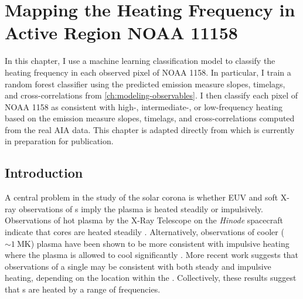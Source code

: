\chapter{Mapping the Heating Frequency in Active Region NOAA 11158}\label{ch:classifying-observables}
\thispagestyle{firstpageofchapterstyle}

In this chapter, I use a machine learning classification model to classify the heating frequency in each observed pixel of \AR{} NOAA 1158. In particular, I train a random forest classifier using the predicted emission measure slopes, timelags, and cross-correlations from \autoref{ch:modeling-observables}. I then classify each pixel of NOAA 1158 as consistent with high-, intermediate-, or low-frequency heating based on the emission measure slopes, timelags, and cross-correlations computed from the real AIA data. This chapter is adapted directly from \citet{barnes_understanding_2019-1} which is currently in preparation for publication.

\section{Introduction}\label{sec:classifying-observables:introduction}

A central problem in the study of the solar corona is whether EUV and soft X-ray observations of \AR s imply the plasma is heated steadily or impulsively. Observations of hot plasma by the X-Ray Telescope \citep[XRT,][]{golub_x-ray_2007} on the \textit{Hinode} spacecraft \citep{kosugi_hinode_2007} indicate that \AR{} cores are heated steadily \citep[e.g.][]{warren_constraints_2011,winebarger_using_2011}. Alternatively, observations of cooler ($\sim\SI{1}{\mega\kelvin}$) plasma have been shown to be more consistent with impulsive heating where the plasma is allowed to cool significantly \citep[e.g]{winebarger_evolving_2003,mulu-moore_determining_2011,ugarte-urra_investigation_2006,viall_patterns_2011,viall_evidence_2012}. More recent work \citep{del_zanna_evolution_2015,bradshaw_patterns_2016} suggests that observations of a single \AR{} may be consistent with both steady and impulsive heating, depending on the location within the \AR{}. Collectively, these results suggest that \AR s are heated by a range of frequencies.


